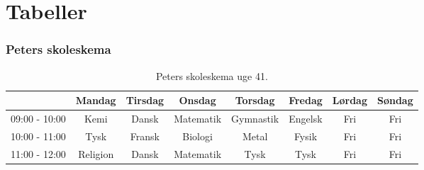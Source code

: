 \chapter{Tabeller}
\subsection{Peters skoleskema}

\begin{table}[htbp]
\centering
\begin{tabular}{|c|c|c|c|c|c|c|c|} %
\hline
& \textbf{Mandag} & \textbf{Tirsdag} & \textbf{Onsdag} & \textbf{Torsdag} & \textbf{Fredag} & \textbf{Lørdag} & \textbf{Søndag} \\\hline
09:00 - 10:00 & Kemi & Dansk & Matematik & Gymnastik & Engelsk & Fri & Fri\\\hline
10:00 - 11:00 & Tysk & Fransk & Biologi & Metal & Fysik & Fri & Fri \\\hline
11:00 - 12:00 & Religion & Dansk & Matematik & Tysk & Tysk & Fri & Fri \\\hline
\end{tabular}
\caption{Peters skoleskema uge 41.}
\label{tab:skoleskema}
\end{table}




